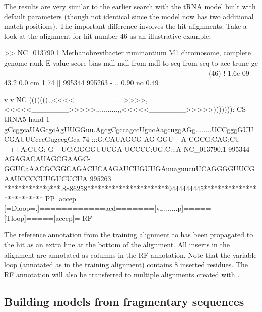 
The results are very similar to the earlier search with the
tRNA model built with default  parameters (though not
identical since the model now has two additional match positions). The
important difference involves the hit alignments. Take a look at the
alignment for hit number 46 as an illustrative example:

\newpage

\begin{widesreoutput}
>> NC_013790.1  Methanobrevibacter ruminantium M1 chromosome, complete genome
 rank     E-value  score  bias mdl mdl from   mdl to       seq from      seq to       acc trunc   gc
 ----   --------- ------ ----- --- -------- --------    ----------- -----------      ---- ----- ----
 (46) !   1.6e-09   43.2   0.0  cm        1       74 []      995344      995263 - .. 0.90    no 0.49

                                 v          v                                                            NC
                     (((((((,,<<<<________._>>>>,<<<<<_______>>>>>,,,........,,<<<<<_______>>>>>))))))): CS
   tRNA5-hand      1 gCcggcaUAGcgcAgUUGGuu.AgcgCgccagccUgucAagcuggAGg........UCCgggGUUCGAUUCcccGugccgGca 74    
                     :::G:CAUAGCG AG  GGU+ A CGCG:CAG:CU +++A:CUG: G+        UC:GGGGUUCGA UCCCC:UG:C:::A
  NC_013790.1 995344 AGAGACAUAGCGAAGC-GGUCaAACGCGGCAGACUCAAGAUCUGUUGAuuaguucuUCAGGGGUUCGAAUCCCCUUGUCUCUA 995263
                     ************9***.8886258***********************9444444445************************** PP
                     [accep]======[=Dloop=.]============acd=======[vl........p]=====[Tloop]=====[accep]= RF
\end{widesreoutput}

The reference annotation from the training alignment to 
has been propagated to the hit as an extra  line at the
bottom of the alignment. All inserts in the alignment are annotated as
 columns in the RF annotation. Note that the variable loop
(annotated as \otext{[vlp]} in the training alignment) contains 8
inserted residues. The RF annotation will also be transferred to
multiple alignments created with .

\subsection{Building models from fragmentary sequences}


